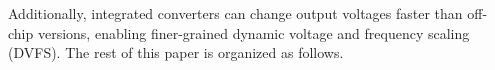 \documentclass[letterpaper,twocolumn,10pt]{article}
\begin{document}
Additionally, integrated converters can change output voltages faster than off-chip versions, enabling finer-grained dynamic voltage and frequency scaling (DVFS). The rest of this paper is organized as follows.\\\  
\end{document}
